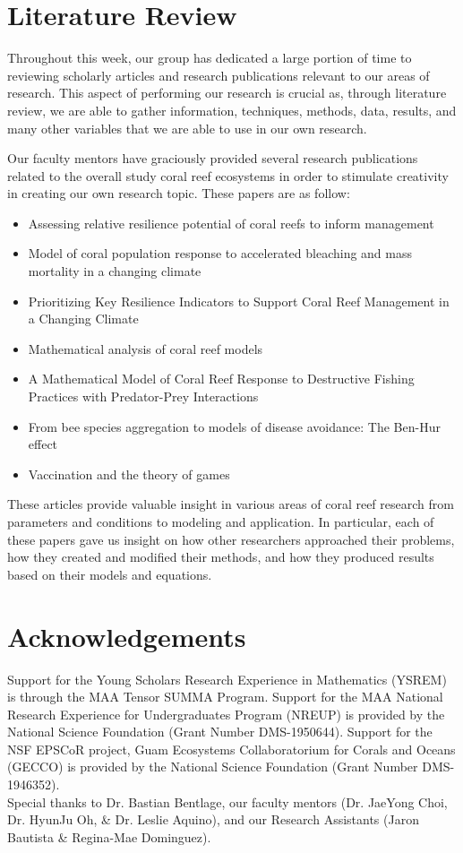 \documentclass[12pt]{article}
\begin{document}
\section{Literature Review}
Throughout this week, our group has dedicated a large portion of time to reviewing scholarly articles and research publications relevant to our areas of research. This aspect of performing our research is crucial as, through literature review, we are able to gather information, techniques, methods, data, results, and many other variables that we are able to use in our own research. \par
Our faculty mentors have graciously provided several research publications related to the overall study coral reef ecosystems in order to stimulate creativity in creating our own research topic. These papers are as follow:
\begin{itemize}
    \item Assessing relative resilience potential of coral reefs to inform management\cite{assesing_relative}
    \item Model of coral population response to accelerated bleaching and mass mortality in a changing climate\cite{Riegl_Purkis_Model}
    \item Prioritizing Key Resilience Indicators to Support Coral Reef Management in a Changing Climate\cite{prioritize}
    \item Mathematical analysis of coral reef models\cite{mathanalysis}
    \item A Mathematical Model of Coral Reef Response to Destructive Fishing Practices with Predator-Prey Interactions\cite{quintero_machuca_cotto_bradley_ríos-soto_2016}
    \item From bee species aggregation to models of disease avoidance: The Ben-Hur effect\cite{yong_herrera_castillo-chavez_2016}
    \item Vaccination and the theory of games\cite{bauch_earn_2004}
\end{itemize}
These articles provide valuable insight in various areas of coral reef research from parameters and conditions to modeling and application. In particular, each of these papers gave us insight on how other researchers approached their problems, how they created and modified their methods, and how they produced results based on their models and equations. 

\section{Acknowledgements}
Support for the Young Scholars Research Experience in Mathematics (YSREM)  is through the MAA Tensor SUMMA Program. Support for the MAA National Research Experience for Undergraduates Program (NREUP) is provided by the National Science Foundation (Grant Number DMS-1950644). Support for the NSF EPSCoR project, Guam Ecosystems Collaboratorium for Corals and Oceans (GECCO) is provided by the National Science Foundation (Grant Number DMS-1946352).\\ 

Special thanks to Dr. Bastian Bentlage, our faculty mentors (Dr. JaeYong Choi, Dr. HyunJu Oh, \& Dr. Leslie Aquino), and our Research Assistants (Jaron Bautista \& Regina-Mae Dominguez).
\newpage
% 
% 
\printbibliography
\end{document}
